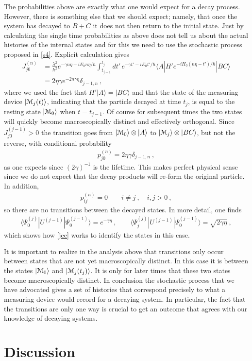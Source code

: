 \documentclass[12pt]{article}
\def\BM{{\EuScript M}}
\def\bra#1{\langle #1|}
\def\ket#1{| #1\rangle}
\newcommand{\EQ}[1]{\begin{equation}\begin{split} #1
\end{split}\end{equation}}
\begin{document}
The probabilities above are exactly what one would expect for a decay process.
However, there is something else that we should expect; namely, that once the system has decayed to $B+C$ it does not then return to the initial state. Just by calculating the single time probabilities as above does not tell us about the actual histories of the internal states and for this we need to use the stochastic process proposed in \ref{s4}. Explicit calculation gives
\EQ{
J^{(n)}_{j0}&=\frac{\lambda^2}{\hbar^2}e^{-\gamma n\eta+iE_0n\eta/\hbar}\int_{t_{j-1}}^{t_j} dt'\,e^{-\gamma t'-iE_0t'/\hbar}\bra{A}H'e^{-iH_0(n\eta-t')/\hbar}\ket{BC}\\ &
=2\eta\gamma e^{-2n\gamma\eta}\delta_{j-1,n}\ ,
}
where we used the fact that $H'\ket{A}=\ket{BC}$ and that
the state of the measuring device $\ket{\BM_j(t)}$, indicating that the particle decayed at time $t_j$, is equal to the resting state $\ket{\BM_0}$ when $t=t_{j-1}$. Of course for subsequent times the two states will quickly become macroscopically distinct and effectively orthogonal. Since $J_{j0}^{(j-1)}>0$ the transition goes from $\ket{\BM_0}\otimes\ket{A}$ to $\ket{\BM_j}\otimes\ket{BC}$, but not the reverse, with conditional probability
\EQ{
p_{j0}^{(n)}=2\eta\gamma\delta_{j-1,n}\ ,
}
as one expects since $(2\gamma)^{-1}$ is the lifetime.
This makes perfect physical sense since we do not expect that the decay products will re-form the original particle. In addition, 
\EQ{
p^{(n)}_{ij}=0\qquad i\neq j\ ,\quad i,j>0\ ,
}
so there are no transitions between the decayed states. In more detail, one finds
\EQ{
\bra{\Psi_0^{(j)}}U^{(j-1)}\ket{\Psi_0^{(j-1)}}=e^{-\gamma\eta}\ ,\qquad
\bra{\Psi_j^{(j)}}U^{(j-1)}\ket{\Psi_0^{(j-1)}}=\sqrt{2\gamma\eta}\ ,
}
which shows how \eqref{jee} works to identify the states in this case. 

It is important to realize in the analysis above that transitions only occur between states that are not yet macroscopically distinct. In this case it is between the states $\ket{\BM_0}$ and $\ket{\BM_j(t_j)}$. It is only for later times that these two states become macroscopically distinct.
In conclusion the stochastic process that we have advocated gives a set of histories that correspond precisely to what a measuring device would record for a decaying system. In particular, the fact that the transitions are only one way is crucial to get an outcome that agrees with our knowledge of decaying systems.


\section{Discussion}
\end{document}
